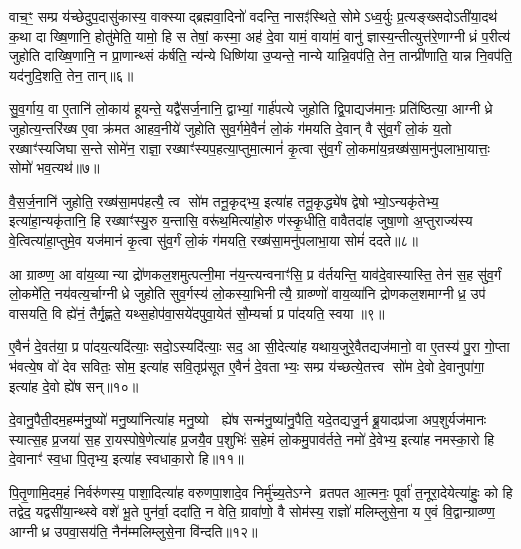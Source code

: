 वाच॒ꣳ॒ सम्प्र य॑च्छेदुप॒दासु॑कास्य॒ वाक्स्याद्ब्रह्मवा॒दिनो॑ वदन्ति॒ नासꣵ॑स्थिते॒ सोमेऽध्व॒र्युः प्र॒त्यङ्ख्सदोऽती॑या॒दथ॑ क॒था दाख्षि॒णानि॒ होतु॑मेति॒ यामो॒ हि स तेषां॒ कस्मा॒ अह॑ दे॒वा यामं॒ वाया॑मं॒ वानु॑ ज्ञास्य॒न्तीत्युत्त॑रे॒णाग्नीध्रं प॒रीत्य॑ जुहोति दाख्षि॒णानि॒ न प्रा॒णान्थ्सं क॑र्\mbox{}षति॒ न्य॑न्ये धिष्णि॑या उ॒प्यन्ते॒ नान्ये यान्नि॒वप॑ति॒ तेन॒ तान्प्री॑णाति॒ यान्न नि॒वप॑ति॒ यद॑नुदि॒शति॒ तेन॒ तान्॥६॥

{\anuvakamend[{स्तु॒ते वि॒न्दते॒ हि वी॑यन्ते प्र॒तीची॑रुद्गा॒त्र उ॒प्यन्ते॒ चतु॑र्दश च॥१॥}]}

सु॒व॒र्गाय॒ वा ए॒तानि॑ लो॒काय॑ हूयन्ते॒ यद्वै॑सर्ज॒नानि॒ द्वाभ्यां॒ गार्\mbox{}ह॑पत्ये जुहोति द्वि॒पाद्यज॑मानः॒ प्रति॑ष्ठित्या॒ आग्नीध्रे जुहोत्य॒न्तरि॑ख्ष ए॒वा क्र॑मत आहव॒नीये॑ जुहोति सुव॒र्गमे॒वैनं॑ लो॒कं ग॑मयति दे॒वान् वै सु॑व॒र्गं लो॒कं य॒तो रख्षाꣳ॑स्यजिघास॒न्ते सोमे॑न॒ राज्ञा॒ रख्षाꣳ॑स्यप॒हत्या॒प्तुमा॒त्मानं॑ कृ॒त्वा सु॑व॒र्गं लो॒कमा॑य॒न्रख्ष॑सा॒मनु॑पलाभा॒यात्तः॒ सोमो॑ भव॒त्यथ॑॥७॥

वै॒स॒र्ज॒नानि॑ जुहोति॒ रख्ष॑सा॒मप॑हत्यै॒ त्व सो॑म तनू॒कृद्भ्य॒ इत्या॑ह तनू॒कृद्ध्ये॑ष द्वेषोभ्यो॒ऽन्यकृ॑तेभ्य॒ इत्या॑हा॒न्यकृ॑तानि॒ हि रख्षाꣳ॑स्यु॒रु य॒न्तासि॒ वरू॑थ॒मित्या॑हो॒रु ण॑स्कृ॒धीति॒ वावैतदा॑ह जुषा॒णो अ॒प्तुराज्य॑स्य वे॒त्वित्या॑हा॒प्तुमे॒व यज॑मानं कृ॒त्वा सु॑व॒र्गं लो॒कं ग॑मयति॒ रख्ष॑सा॒मनु॑पलाभा॒या सोमं॑ ददते॥८॥

आ ग्राव्ण्ण॒ आ वा॑य॒व्यान्या द्रो॑णकल॒शमुत्पत्नी॒मा न॑य॒न्त्यन्वनाꣳ॑सि॒ प्र व॑र्तयन्ति॒ याव॑दे॒वास्यास्ति॒ तेन॑ स॒ह सु॑व॒र्गं लो॒कमे॑ति॒ नय॑वत्य॒र्चाग्नीध्रे जुहोति सुव॒र्गस्य॑ लो॒कस्या॒भिनीत्यै॒ ग्राव्ण्णो॑ वाय॒व्या॑नि द्रोणकल॒शमाग्नीध्र॒ उप॑ वासयति॒ वि ह्ये॑नं॒ तैर्गृ॒ह्णते॒ यथ्स॒होप॑वा॒सये॑दपुवा॒येत॑ सौ॒म्यर्चा प्र पा॑दयति॒ स्वया॥९॥

ए॒वैनं॑ दे॒वत॑या॒ प्र पा॑दय॒त्यदि॑त्याः॒ सदो॒ऽस्यदि॑त्याः॒ सद॒ आ सी॒देत्या॑ह यथाय॒जुरे॒वैतद्यज॑मानो॒ वा ए॒तस्य॑ पु॒रा गो॒प्ता भ॑वत्ये॒ष वो॑ देव सवितः॒ सोम॒ इत्या॑ह सवि॒तृप्र॑सूत ए॒वैनं॑ दे॒वताभ्यः॒ सम्प्र य॑च्छत्ये॒तत्त्व सो॑म दे॒वो दे॒वानुपा॑गा॒ इत्या॑ह दे॒वो ह्ये॑ष सन्॥१०॥

दे॒वानु॒पैती॒दम॒हम्म॑नु॒ष्यो॑ मनु॒ष्या॑नित्या॑ह मनु॒ष्यो  ह्ये॑ष सन्म॑नु॒ष्या॑नु॒पैति॒ यदे॒तद्यजु॒र्न ब्रू॒यादप्र॑जा अप॒शुर्यज॑मानः स्यात्स॒ह प्र॒जया॑ स॒ह रा॒यस्पोषे॒णेत्या॑ह प्र॒जयै॒व प॒शुभिः॑ स॒हेमं लो॒कमु॒पाव॑र्तते॒ नमो॑ दे॒वेभ्य॒ इत्या॑ह नमस्का॒रो हि दे॒वानाꣳ॑ स्व॒धा पि॒तृभ्य॒ इत्या॑ह स्वधाका॒रो हि॥११॥

पि॒तृ॒णामि॒दम॒हं निर्वरु॑णस्य॒ पाशा॒दित्या॑ह वरुणपा॒शादे॒व निर्मु॑च्य॒तेऽग्ने व्रतपत आ॒त्मनः॒ पूर्वा॑ त॒नूरा॒देयेत्या॑हुः॒ को हि तद्वेद॒ यद्वसी॑या॒न्थ्स्वे वशे॑ भू॒ते पुन॑र्वा॒ ददा॑ति॒ न वेति॒ ग्रावा॑णो॒ वै सोम॑स्य॒ राज्ञो॑ मलिम्लुसे॒ना य ए॒वं वि॒द्वान्ग्राव्ण्ण॒ आग्नीध्र उपवा॒सय॑ति॒ नैन॑म्मलिम्लुसे॒ना वि॑न्दति॥१२॥

